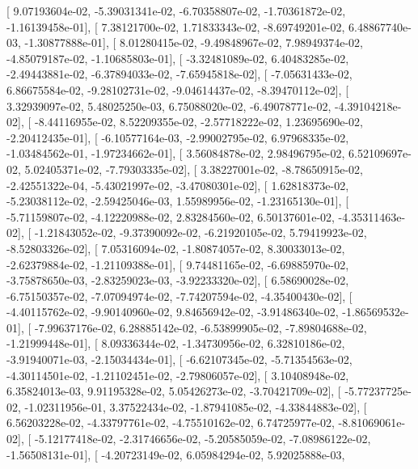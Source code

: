 \documentclass{article}
\begin{document}
       [  9.07193604e-02,  -5.39031341e-02,  -6.70358807e-02,
         -1.70361872e-02,  -1.16139458e-01],
       [  7.38121700e-02,   1.71833343e-02,  -8.69749201e-02,
          6.48867740e-03,  -1.30877888e-01],
       [  8.01280415e-02,  -9.49848967e-02,   7.98949374e-02,
         -4.85079187e-02,  -1.10685803e-01],
       [ -3.32481089e-02,   6.40483285e-02,  -2.49443881e-02,
         -6.37894033e-02,  -7.65945818e-02],
       [ -7.05631433e-02,   6.86675584e-02,  -9.28102731e-02,
         -9.04614437e-02,  -8.39470112e-02],
       [  3.32939097e-02,   5.48025250e-03,   6.75088020e-02,
         -6.49078771e-02,  -4.39104218e-02],
       [ -8.44116955e-02,   8.52209355e-02,  -2.57718222e-02,
          1.23695690e-02,  -2.20412435e-01],
       [ -6.10577164e-03,  -2.99002795e-02,   6.97968335e-02,
         -1.03484562e-01,  -1.97234662e-01],
       [  3.56084878e-02,   2.98496795e-02,   6.52109697e-02,
          5.02405371e-02,  -7.79303335e-02],
       [  3.38227001e-02,  -8.78650915e-02,  -2.42551322e-04,
         -5.43021997e-02,  -3.47080301e-02],
       [  1.62818373e-02,  -5.23038112e-02,  -2.59425046e-03,
          1.55989956e-02,  -1.23165130e-01],
       [ -5.71159807e-02,  -4.12220988e-02,   2.83284560e-02,
          6.50137601e-02,  -4.35311463e-02],
       [ -1.21843052e-02,  -9.37390092e-02,  -6.21920105e-02,
          5.79419923e-02,  -8.52803326e-02],
       [  7.05316094e-02,  -1.80874057e-02,   8.30033013e-02,
         -2.62379884e-02,  -1.21109388e-01],
       [  9.74481165e-02,  -6.69885970e-02,  -3.75878650e-03,
         -2.83259023e-03,  -3.92233320e-02],
       [  6.58690028e-02,  -6.75150357e-02,  -7.07094974e-02,
         -7.74207594e-02,  -4.35400430e-02],
       [ -4.40115762e-02,  -9.90140960e-02,   9.84656942e-02,
         -3.91486340e-02,  -1.86569532e-01],
       [ -7.99637176e-02,   6.28885142e-02,  -6.53899905e-02,
         -7.89804688e-02,  -1.21999448e-01],
       [  8.09336344e-02,  -1.34730956e-02,   6.32810186e-02,
         -3.91940071e-03,  -2.15034434e-01],
       [ -6.62107345e-02,  -5.71354563e-02,  -4.30114501e-02,
         -1.21102451e-02,  -2.79806057e-02],
       [  3.10408948e-02,   6.35824013e-03,   9.91195328e-02,
          5.05426273e-02,  -3.70421709e-02],
       [ -5.77237725e-02,  -1.02311956e-01,   3.37522434e-02,
         -1.87941085e-02,  -4.33844883e-02],
       [  6.56203228e-02,  -4.33797761e-02,  -4.75510162e-02,
          6.74725977e-02,  -8.81069061e-02],
       [ -5.12177418e-02,  -2.31746656e-02,  -5.20585059e-02,
         -7.08986122e-02,  -1.56508131e-01],
       [ -4.20723149e-02,   6.05984294e-02,   5.92025888e-03,
\end{document}
